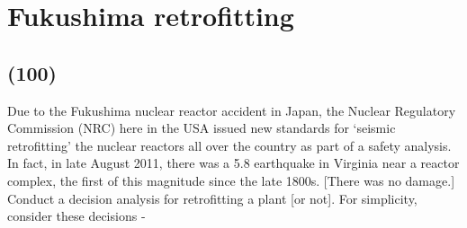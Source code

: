 \documentclass[11pt,a4paper]{article}
\begin{document}
\newpage


\section{Fukushima retrofitting}
\subsection*{(100)}
Due to the Fukushima nuclear reactor accident in Japan, the Nuclear Regulatory Commission (NRC) here in the USA issued new standards for ‘seismic retrofitting’ the nuclear reactors all over the country as part of a safety analysis. In fact, in late August 2011, there was a 5.8 earthquake in Virginia near a reactor complex, the first of this magnitude since the late 1800s. [There was no damage.] Conduct a decision analysis for retrofitting a plant [or not]. For simplicity, consider these decisions - 
\end{document}
